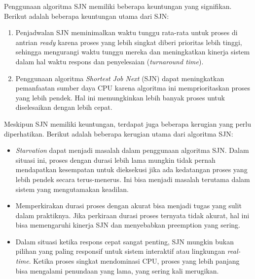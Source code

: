 \documentclass[12pt]{article}
\begin{document}
     \hspace{1cm}Penggunaan algoritma SJN memiliki beberapa keuntungan yang signifikan. Berikut adalah beberapa keuntungan utama dari SJN:
     \begin{enumerate}
         \item Penjadwalan SJN meminimalkan waktu tunggu rata-rata untuk proses di antrian \textit{ready} karena proses yang lebih singkat diberi prioritas lebih tinggi, sehingga mengurangi waktu tunggu mereka dan meningkatkan kinerja sistem dalam hal waktu respons dan penyelesaian (\textit{turnaround time}).
         \item Penggunaan algoritma \textit{Shortest Job Next} (SJN) dapat meningkatkan pemanfaatan sumber daya CPU karena algoritma ini memprioritaskan proses yang lebih pendek. Hal ini memungkinkan lebih banyak proses untuk diselesaikan dengan lebih cepat.
     \end{enumerate}
     
    \hspace{1cm}Meskipun SJN memiliki keuntungan, terdapat juga beberapa kerugian yang perlu diperhatikan. Berikut adalah beberapa kerugian utama dari algoritma SJN:
    \begin{itemize}
        \item \textit{Starvation} dapat menjadi masalah dalam penggunaan algoritma SJN. Dalam situasi ini, proses dengan durasi lebih lama mungkin tidak pernah mendapatkan kesempatan untuk dieksekusi jika ada kedatangan proses yang lebih pendek secara terus-menerus. Ini bisa menjadi masalah terutama dalam sistem yang mengutamakan keadilan.
        \item Memperkirakan durasi proses dengan akurat bisa menjadi tugas yang sulit dalam praktiknya. Jika perkiraan durasi proses ternyata tidak akurat, hal ini bisa memengaruhi kinerja SJN dan menyebabkan preemption yang sering.
        \item Dalam situasi ketika respons cepat sangat penting, SJN mungkin bukan pilihan yang paling responsif untuk sistem interaktif atau lingkungan \textit{real-time}. Ketika proses singkat mendominasi CPU, proses yang lebih panjang bisa mengalami penundaan yang lama, yang sering kali merugikan.
    \end{itemize}
\end{document}

